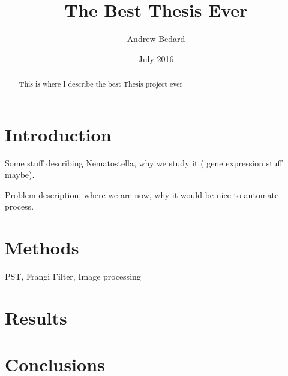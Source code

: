 \documentclass[10pt,a4paper]{article}
\title{The Best Thesis Ever}
\author{Andrew Bedard}
\date{July 2016}
\begin{document}
\maketitle

\begin{abstract}
	This is where I describe the best Thesis project ever
\end{abstract}

\section{Introduction}
	Some stuff describing Nematostella, why we study it ( gene expression stuff maybe).
	
	Problem description, where we are now, why it would be nice to automate process.
	
\section{Methods}
	PST, Frangi Filter, Image processing
	
\section{Results}
\section{Conclusions}
\end{document}
